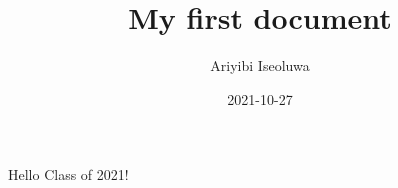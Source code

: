 \documentclass{article}
\title{My first document}
\date{2021-10-27}
\author{Ariyibi Iseoluwa}
\begin{document}
	\maketitle
	\newpage
	Hello Class of 2021!
\end{document}
